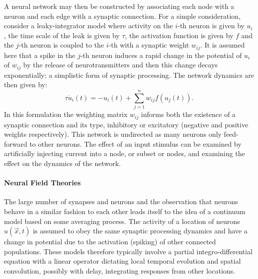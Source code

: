 A neural network may then be constructed by associating each node with a neuron and each edge with a synaptic connection. For a simple consideration, consider a leaky-integrator model where activity on the $i$-th neuron is given by $u_i$, the time scale of the leak is given by $\tau$, the activation function is given by $f$ and the $j$-th neuron is coupled to the $i$-th with a synaptic weight $w_{ij}$. It is assumed here that a spike in the $j$-th neuron induces a rapid change in the potential of $u_i$ of $w_{ij}$ by the release of neurotransmitters and then this change decays exponentially; a simplistic form of synaptic processing. The network dynamics are then given by:
\begin{equation}
\tau\dot{u}_i(t)=-u_i(t)+\sum_{j=1}^{n}w_{ij}f(u_j(t)).
\end{equation}
In this formulation the weighting matrix $w_{ij}$ informs both the existence of a synaptic connection and its type, inhibitory or excitatory (negative and positive weights respectively). This network is undirected as many neurons only feed-forward to other neurons. The effect of an input stimulus can be examined by artificially injecting current into a node, or subset or nodes, and examining the effect on the dynamics of the network.

\paragraph{Neural Field Theories}
The large number of synapses and neurons and the observation that neurons behave in a similar fashion to each other leads itself to the idea of a continuum model based on some averaging process. The activity of a location of neurons $u(\vec{x},t)$ is assumed to obey the same synaptic processing dynamics and have a change in potential due to the activation (spiking) of other connected populations. These models therefore typically involve a partial integro-differential equation with a linear operator dictating local temporal evolution and spatial convolution, possibly with delay, integrating responses from other locations.

